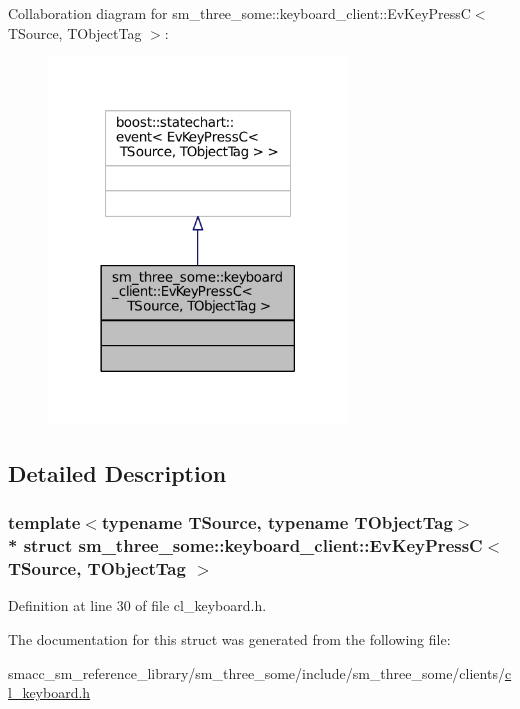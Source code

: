 Collaboration diagram for sm\+\_\+three\+\_\+some\+:\+:keyboard\+\_\+client\+:\+:Ev\+Key\+PressC$<$ T\+Source, T\+Object\+Tag $>$\+:
\nopagebreak
\begin{figure}[H]
\begin{center}
\leavevmode
\includegraphics[width=225pt]{structsm__three__some_1_1keyboard__client_1_1EvKeyPressC__coll__graph}
\end{center}
\end{figure}


\subsection{Detailed Description}
\subsubsection*{template$<$typename T\+Source, typename T\+Object\+Tag$>$\\*
struct sm\+\_\+three\+\_\+some\+::keyboard\+\_\+client\+::\+Ev\+Key\+Press\+C$<$ T\+Source, T\+Object\+Tag $>$}



Definition at line 30 of file cl\+\_\+keyboard.\+h.



The documentation for this struct was generated from the following file\+:\begin{DoxyCompactItemize}
\item 
smacc\+\_\+sm\+\_\+reference\+\_\+library/sm\+\_\+three\+\_\+some/include/sm\+\_\+three\+\_\+some/clients/\hyperlink{cl__keyboard_8h}{cl\+\_\+keyboard.\+h}\end{DoxyCompactItemize}

